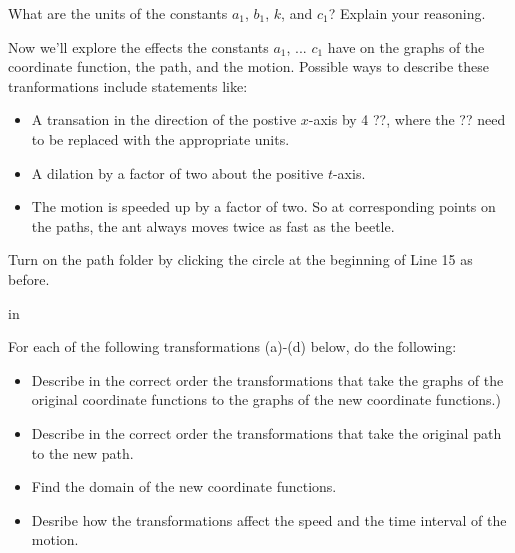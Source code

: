 \documentclass{ximera}
\newcommand{\pskip}{\vskip 0.1 in}
\begin{document}
\begin{example}
\begin{question}
What are the units of the constants $a_1$, $b_1$, $k$, and $c_1$? Explain your reasoning.
\end{question}


Now we'll explore the effects the constants $a_1$, ... $c_1$ have on the graphs of the coordinate function, the path, and the motion. Possible ways to describe these tranformations include statements like:

\begin{itemize}
\item{A transation in the direction of the postive $x$-axis by 4 ??, where the ?? need to be replaced with the appropriate units.}

\item{A dilation by a factor of two about the positive $t$-axis.}

\item{The motion is speeded up by a factor of two. So at corresponding points on the paths, the ant always moves twice as fast as the beetle.}

\end{itemize}



\begin{exploration}\label{exp:pc2c}
Turn on the path folder by clicking the circle at the beginning of Line 15 as before. 

\pskip

For each of the following transformations (a)-(d) below, do the following:

\begin{itemize}

\item{Describe in the correct order the transformations that take the graphs of the original coordinate functions to the graphs of the new coordinate functions.)} 

\item{Describe in the correct order the transformations that take the original path to the new path.}

\item{Find the domain of the new coordinate functions.}

\item{Desribe how the transformations affect the speed and the time interval of the motion.}


\end{itemize}
\end{exploration}
\end{example}
\end{document}
